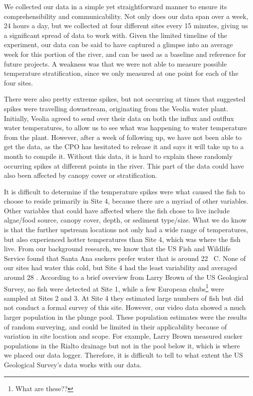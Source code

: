 \documentclass{article}\usepackage[]{graphicx}\usepackage[]{color}
\begin{document}
We collected our data in a simple yet straightforward manner to ensure its comprehensibility and communicability. Not only does our data span over a week, 24 hours a day, but we collected at four different sites every 15 minutes, giving us a significant spread of data to work with. Given the limited timeline of the experiment, our data can be said to have captured a glimpse into an average week for this portion of the river, and can be used as a baseline and reference for future projects. A weakness was that we were not able to measure possible temperature stratification, since we only measured at one point for each of the four sites. 

There were also pretty extreme spikes, but not occurring at times that suggested spikes were travelling downstream, originating from the Veolia water plant. Initially, Veolia agreed to send over their data on both the influx and outflux water temperatures, to allow us to see what was happening to water temperature from the plant. However, after a week of following up, we have not been able to get the data, as the CPO has hesitated to release it and says it will take up to a month to compile it. Without this data, it is hard to explain these randomly occurring spikes at different points in the river. This part of the data could have also been affected by canopy cover or stratification. 

It is difficult to determine if the temperature spikes were what caused the fish to choose to reside primarily in Site 4, because there are a myriad of other variables. Other variables that could have affected where the fish chose to live include algae/food source, canopy cover, depth, or sediment type/size. What we do know is that the further upstream locations not only had a wide range of temperatures, but also experienced hotter temperatures than Site 4, which was where the fish live. From our background research, we know that the US Fish and Wildlife Service found that Santa Ana suckers prefer water that is around 22 \textdegree~C. None of our sites had water this cold, but Site 4 had the least variability and averaged around 28 \textdegree. According to a brief overview from Larry Brown of the US Geological Survey, no fish were detected at Site 1, while a few European chubs\footnote{What are these??} were sampled at Sites 2 and 3. At Site 4 they estimated large numbers of fish but did not conduct a formal survey of this site. However, our video data showed a much larger population in the plunge pool. These population estimates were the results of random surveying, and could be limited in their applicability because of variation in site location and scope. For example, Larry Brown measured sucker populations in the Rialto drainage but not in the pool below it, which is where we placed our data logger. Therefore, it is difficult to tell to what extent the US Geological Survey's data works with our data. 
\end{document}

